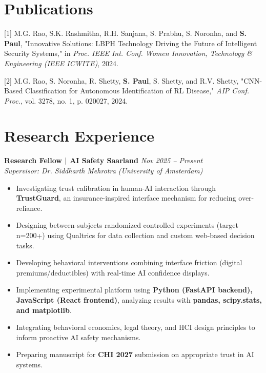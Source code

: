 \documentclass[a4paper,11pt]{article}
\begin{document}
\section{Publications}
[1] M.G. Rao, S.K. Rashmitha, R.H. Sanjana, S. Prabhu, S. Noronha, and \textbf{S. Paul}, "Innovative Solutions: LBPH Technology Driving the Future of Intelligent Security Systems," in \textit{Proc. IEEE Int. Conf. Women Innovation, Technology \& Engineering (IEEE ICWITE)}, 2024.

[2] M.G. Rao, S. Noronha, R. Shetty, \textbf{S. Paul}, S. Shetty, and R.V. Shetty, "CNN-Based Classification for Autonomous Identification of RL Disease," \textit{AIP Conf. Proc.}, vol. 3278, no. 1, p. 020027, 2024.

\section{Research Experience}
\textbf{Research Fellow | AI Safety Saarland} \hfill \textit{Nov 2025 -- Present} \\
\textit{Supervisor: Dr. Siddharth Mehrotra (University of Amsterdam)}
\begin{itemize}
    \item Investigating trust calibration in human-AI interaction through \textbf{TrustGuard}, an insurance-inspired interface mechanism for reducing over-reliance.
    \item Designing between-subjects randomized controlled experiments (target n=200+) using Qualtrics for data collection and custom web-based decision tasks.
    \item Developing behavioral interventions combining interface friction (digital premiums/deductibles) with real-time AI confidence displays.
    \item Implementing experimental platform using \textbf{Python (FastAPI backend), JavaScript (React frontend)}, analyzing results with \textbf{pandas, scipy.stats, and matplotlib}.
    \item Integrating behavioral economics, legal theory, and HCI design principles to inform proactive AI safety mechanisms.
    \item Preparing manuscript for \textbf{CHI 2027} submission on appropriate trust in AI systems.
\end{itemize}
\end{document}
